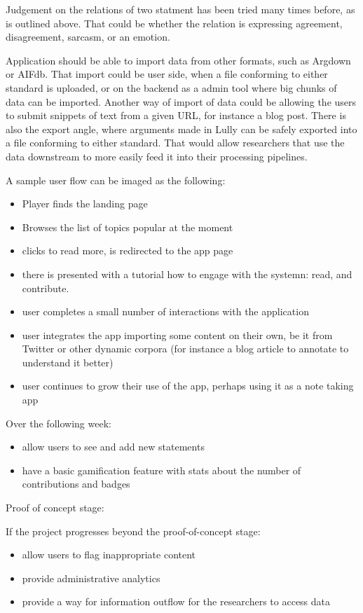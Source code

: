 \documentclass{report}
\begin{document}
Judgement on the relations of two statment has been tried many times before, as is outlined above. That could be whether the relation is expressing agreement, disagreement, sarcasm, or an emotion.

Application should be able to import data from other formats, such as Argdown or AIFdb. That import could be user side, when a file conforming to either standard is uploaded, or on the backend as a admin tool where big chunks of data can be imported.
Another way of import of data could be allowing the users to submit snippets of text from a given URL, for instance a blog post.
There is also the export angle, where arguments made in Lully can be safely exported into a file conforming to either standard. That would allow researchers that use the data downstream to more easily feed it into their processing pipelines.


A sample user flow can be imaged as the following:
\begin{itemize}
  \item Player finds the landing page
  \item Browses the list of topics popular at the moment
  \item clicks to read more, is redirected to the app page
  \item there is presented with a tutorial how to engage with the systemn: read, and contribute.
\end{itemize}

\begin{itemize}
  \item user completes a small number of interactions with the application
  \item user integrates the app importing some content on their own, be it from Twitter or other dynamic corpora (for instance a blog article to annotate to understand it better)
  \item user continues to grow their use of the app, perhaps using it as a note taking app
\end{itemize}

Over the following week:
\begin{itemize}
  \item allow users to see and add new statements
  \item have a basic gamification feature with stats about the number of contributions and badges
\end{itemize}
Proof of concept stage:

If the project progresses beyond the proof-of-concept stage:
\begin{itemize}
  \item allow users to flag inappropriate content
  \item provide administrative analytics 
  \item provide a way for information outflow for the researchers to access data
\end{itemize}
\end{document}
